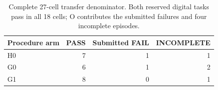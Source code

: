 \begin{table}[!htbp]
\centering\small
\caption{Complete 27-cell transfer denominator. Both reserved digital tasks pass in all 18 cells; O contributes the submitted failures and four incomplete episodes.}
\label{tab:finalarms}
\begin{tabular}{@{}lrrr@{}}\toprule
Procedure arm & PASS & Submitted FAIL & INCOMPLETE \\\midrule
H0 & 7 & 1 & 1 \\
G0 & 6 & 1 & 2 \\
G1 & 8 & 0 & 1 \\
\bottomrule\end{tabular}
\end{table}
